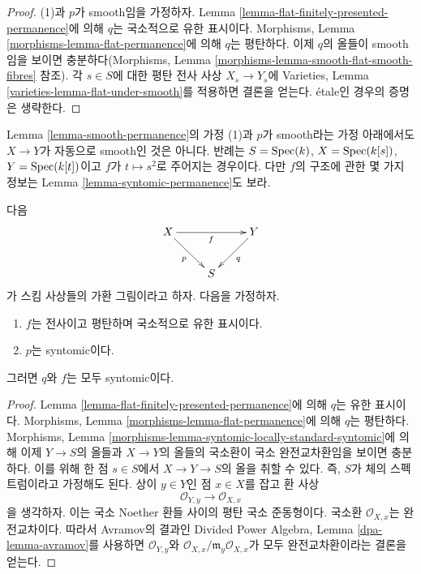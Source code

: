 \begin{proof}
(1)과 $p$가 smooth임을 가정하자. Lemma
\ref{lemma-flat-finitely-presented-permanence}에 의해 $q$는 국소적으로 유한
표시이다. Morphisms, Lemma \ref{morphisms-lemma-flat-permanence}에 의해
$q$는 평탄하다. 이제 $q$의 올들이 smooth임을 보이면 충분하다(Morphisms,
Lemma \ref{morphisms-lemma-smooth-flat-smooth-fibres} 참조). 각 $s \in S$에
대한 평탄 전사 사상 $X_s \to Y_s$에 Varieties, Lemma
\ref{varieties-lemma-flat-under-smooth}를 적용하면 결론을 얻는다. \'etale인
경우의 증명은 생략한다.
\end{proof}

\begin{remark}
\label{remark-smooth-permanence}
Lemma \ref{lemma-smooth-permanence}의 가정 (1)과 $p$가 smooth라는 가정
아래에서도 $X \to Y$가 자동으로 smooth인 것은 아니다. 반례는
$S = \mathop{\mathrm{Spec}}(k)$, $X = \mathop{\mathrm{Spec}}(k[s])$, $Y = \mathop{\mathrm{Spec}}(k[t])$이고
$f$가 $t \mapsto s^2$로 주어지는 경우이다. 다만 $f$의 구조에 관한 몇 가지
정보는 Lemma \ref{lemma-syntomic-permanence}도 보라.
\end{remark}

\begin{lemma}
\label{lemma-syntomic-permanence}
다음
$$
\xymatrix{
X \ar[rr]_f \ar[rd]_p & &
Y \ar[dl]^q \\
& S
}
$$
가 스킴 사상들의 가환 그림이라고 하자. 다음을 가정하자.
\begin{enumerate}
\item $f$는 전사이고 평탄하며 국소적으로 유한 표시이다.
\item $p$는 syntomic이다.
\end{enumerate}
그러면 $q$와 $f$는 모두 syntomic이다.
\end{lemma}

\begin{proof}
Lemma \ref{lemma-flat-finitely-presented-permanence}에 의해 $q$는 유한
표시이다. Morphisms, Lemma \ref{morphisms-lemma-flat-permanence}에 의해
$q$는 평탄하다. Morphisms, Lemma
\ref{morphisms-lemma-syntomic-locally-standard-syntomic}에 의해 이제
$Y \to S$의 올들과 $X \to Y$의 올들의 국소환이 국소 완전교차환임을
보이면 충분하다. 이를 위해 한 점 $s \in S$에서 $X \to Y \to S$의 올을
취할 수 있다. 즉, $S$가 체의 스펙트럼이라고 가정해도 된다. 상이
$y \in Y$인 점 $x \in X$를 잡고 환 사상
$$
\mathcal{O}_{Y, y} \longrightarrow \mathcal{O}_{X, x}
$$
을 생각하자. 이는 국소 Noether 환들 사이의 평탄 국소 준동형이다.
국소환 $\mathcal{O}_{X, x}$는 완전교차이다. 따라서 Avramov의 결과인
Divided Power Algebra, Lemma \ref{dpa-lemma-avramov}를 사용하면
$\mathcal{O}_{Y, y}$와
$\mathcal{O}_{X, x}/\mathfrak m_y\mathcal{O}_{X, x}$가 모두
완전교차환이라는 결론을 얻는다.
\end{proof}


